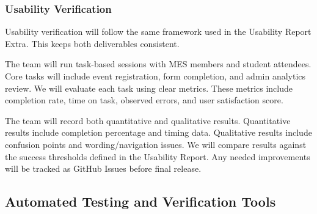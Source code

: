 \documentclass[12pt, titlepage]{article}
\begin{document}
\subsubsection*{Usability Verification}
Usability verification will follow the same framework used in the Usability Report Extra. This keeps both deliverables consistent.

The team will run task-based sessions with MES members and student attendees. Core tasks will include event registration, form completion, and admin analytics review. We will evaluate each task using clear metrics. These metrics include completion rate, time on task, observed errors, and user satisfaction score.

The team will record both quantitative and qualitative results. Quantitative results include completion percentage and timing data. Qualitative results include confusion points and wording/navigation issues. We will compare results against the success thresholds defined in the Usability Report. Any needed improvements will be tracked as GitHub Issues before final release.

\subsection{Automated Testing and Verification Tools}
\end{document}
